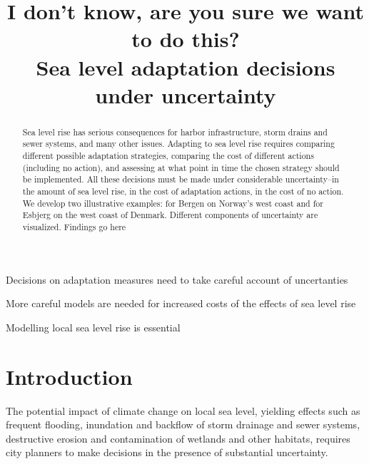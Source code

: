 \documentclass[draft,linenumbers]{agujournal}
\begin{document}
\title{I don't know, are you sure we want to do this?\\
Sea level adaptation decisions under uncertainty}




\begin{keypoints}
\item Decisions on adaptation measures need to take careful account of uncertanties
\item More careful models are needed for increased costs of the effects of sea level rise
\item Modelling local sea level rise is essential
\end{keypoints}


\begin{abstract}
Sea level rise has serious consequences for harbor infrastructure, storm drains and sewer systems, and many other issues. Adapting to sea level rise requires comparing different possible adaptation strategies, comparing the cost of different actions (including no action), and assessing at what point in time the chosen strategy should be implemented. All these decisions must be made under considerable uncertainty--in the amount of sea level rise, in the cost of adaptation actions, in the cost of no action. We develop two illustrative examples: for Bergen on Norway's west coast and for Esbjerg on the west coast of Denmark. Different components of uncertainty are visualized. {\color{blue} Findings go here}
\end{abstract}




\section{Introduction}\label{sec:intro}
The potential impact of climate change on local sea level, yielding effects such as frequent flooding, inundation and backflow of storm drainage and sewer systems, destructive erosion and contamination of wetlands and other habitats, requires city planners to make decisions in the presence of substantial uncertainty.
\end{document}
